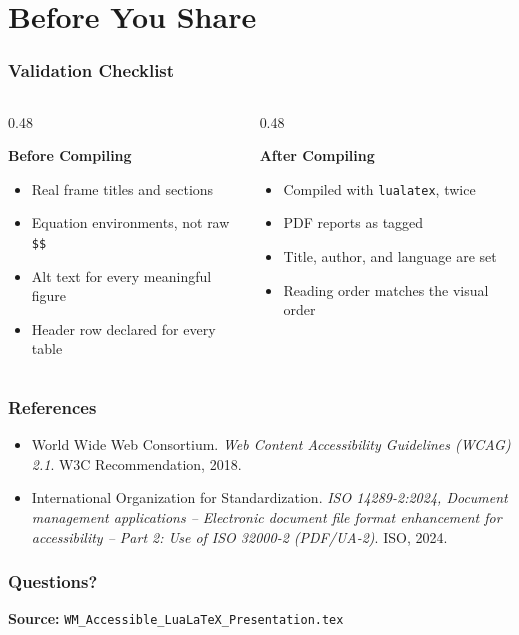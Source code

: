 \documentclass[aspect-ratio=16:9]{ltx-talk}
\newcommand{\wmblocktitle}[3]{%
	\par\noindent
	\colorbox{#1}{\parbox{\dimexpr\linewidth-2\fboxsep\relax}{\color{#2}\bfseries\large #3}}%
	\par\vspace{4pt}%
}
\begin{document}
\section{Before You Share}

\begin{frame}
	\frametitle{Validation Checklist}
	\begin{columns}
		\begin{column}{0.48\textwidth}
			\wmblocktitle{WMGold}{black}{Before Compiling}
			\begin{itemize}
				\item Real frame titles and sections
				\item Equation environments, not raw \texttt{\$\$}
				\item Alt text for every meaningful figure
				\item Header row declared for every table
			\end{itemize}
		\end{column}
		\begin{column}{0.48\textwidth}
			\wmblocktitle{WMGold}{black}{After Compiling}
			\begin{itemize}
				\item Compiled with \texttt{lualatex}, twice
				\item PDF reports as tagged
				\item Title, author, and language are set
				\item Reading order matches the visual order
			\end{itemize}
		\end{column}
	\end{columns}
\end{frame}

\begin{frame}
	\frametitle{References}
	\begin{itemize}
		\item World Wide Web Consortium. \emph{Web Content Accessibility Guidelines (WCAG) 2.1}. W3C Recommendation, 2018.
		\item International Organization for Standardization. \emph{ISO 14289-2:2024, Document management applications -- Electronic document file format enhancement for accessibility -- Part 2: Use of ISO 32000-2 (PDF/UA-2)}. ISO, 2024.
	\end{itemize}
\end{frame}

\begin{frame}
	\frametitle{Questions?}
	\textbf{Source:} \texttt{WM\_Accessible\_LuaLaTeX\_Presentation.tex}
\end{frame}
\end{document}
